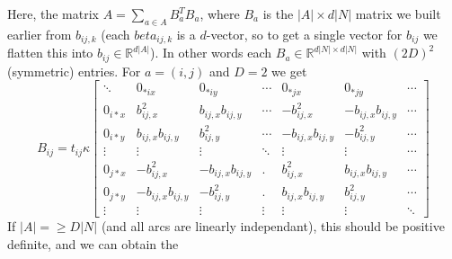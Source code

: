 \documentclass{article}
\begin{document}
Here, the matrix $A=\sum_{a\in A} B_a^TB_a$, where $B_a$ is the $|A| \times
d|N|$ matrix we built earlier from $b_{ij,k}$ (each $beta_{ij,k}$ is a
$d$-vector, so to get a single vector for $b_{ij}$ we flatten this into
$b_{ij}\in\mathbb{R}^{d|A|}$). In other words each
$B_a\in\mathbb{R}^{d|N|\times d|N|}$ with $(2D)^2$ (symmetric) entries. For $a=(i,j)$ and $D=2$ we get 
\[
    B_{ij} = t_{ij}\kappa\left[
        \begin{array}{ccccccc}
            \ddots  & 0_{*ix}           & 0_{*iy}           & \cdots & 0_{*jx}           & 0_{*jy}           & \cdots \\
            0_{i*x} & b_{ij,x}^2        & b_{ij,x}b_{ij,y}  & \cdots & -b_{ij,x}^2       & -b_{ij,x}b_{ij,y} & \cdots \\
            0_{i*y} & b_{ij,x}b_{ij,y}  & b_{ij,y}^2        & \cdots & -b_{ij,x}b_{ij,y} & - b_{ij,y}^2      & \cdots \\
            \vdots  & \vdots            & \vdots            & \ddots & \vdots            & \vdots            & \cdots \\
            0_{j*x} & -b_{ij,x}^2       & -b_{ij,x}b_{ij,y} & .      & b_{ij,x}^2        & b_{ij,x}b_{ij,y}  & \cdots \\
            0_{j*y} & -b_{ij,x}b_{ij,y} & -b_{ij,y}^2       & .      & b_{ij,x}b_{ij,y}  & b_{ij,y}^2        & \cdots \\
            \vdots  & \vdots            & \vdots            & \vdots & \vdots            & \vdots            & \ddots 
        \end{array}
    \right]
\]
If $|A| =\geq D|N|$ (and all arcs are linearly independant), this should be positive definite, and we can obtain the 
\end{document}
